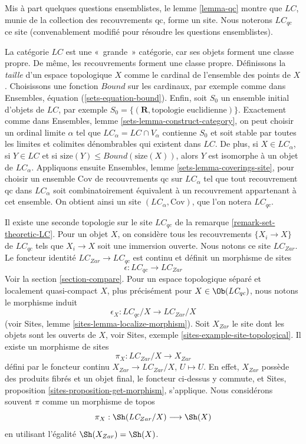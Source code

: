 \noindent
Mis à part quelques questions ensemblistes, le lemme \ref{lemma-qc} montre
que $\textit{LC}$, munie de la collection des recouvrements qc, forme un
site. Nous noterons $\textit{LC}_{qc}$ ce site (convenablement modifié pour
résoudre les questions ensemblistes).

\begin{remark}
\label{remark-set-theoretic-LC}
La catégorie $\textit{LC}$ est une «~grande~» catégorie, car ses objets
forment une classe propre. De même, les recouvrements forment une classe
propre. Définissons la {\it taille} d'un espace topologique $X$ comme le
cardinal de l'ensemble des points de $X$. Choisissons une fonction $Bound$ sur
les cardinaux, par exemple comme dans
Ensembles, équation (\ref{sets-equation-bound}).
Enfin, soit $S_0$ un ensemble initial d'objets de $\textit{LC}$, par exemple
$S_0 = \{(\mathbf{R}, \text{topologie euclidienne})\}$.
Exactement comme dans Ensembles, lemme \ref{sets-lemma-construct-category},
on peut choisir un ordinal limite $\alpha$ tel que
$\textit{LC}_\alpha = \textit{LC} \cap V_\alpha$ contienne $S_0$ et soit
stable par toutes les limites et colimites dénombrables qui existent dans
$\textit{LC}$. De plus, si $X \in \textit{LC}_\alpha$, si
$Y \in \textit{LC}$ et si
$\text{size}(Y) \leq Bound(\text{size}(X))$, alors $Y$ est isomorphe à un
objet de $\textit{LC}_\alpha$.
Appliquons ensuite Ensembles, lemme \ref{sets-lemma-coverings-site}, pour
choisir un ensemble $\text{Cov}$ de recouvrements qc sur
$\textit{LC}_\alpha$ tel que tout recouvrement qc dans
$\textit{LC}_\alpha$ soit combinatoirement équivalent à un recouvrement
appartenant à cet ensemble. On obtient ainsi un site
$(\textit{LC}_\alpha, \text{Cov})$, que l'on notera $\textit{LC}_{qc}$.
\end{remark}

\noindent
Il existe une seconde topologie sur le site $\textit{LC}_{qc}$ de la
remarque \ref{remark-set-theoretic-LC}. Pour un objet $X$, on considère tous
les recouvrements $\{X_i \to X\}$ de $\textit{LC}_{qc}$ tels que
$X_i \to X$ soit une immersion ouverte. Nous notons ce site
$\textit{LC}_{Zar}$. Le foncteur identité
$\textit{LC}_{Zar} \to \textit{LC}_{qc}$ est continu et définit un morphisme
de sites
$$
\epsilon : \textit{LC}_{qc} \longrightarrow \textit{LC}_{Zar}
$$
Voir la section \ref{section-compare}.
Pour un espace topologique séparé et localement quasi-compact $X$, plus
précisément pour $X \in \Ob(\textit{LC}_{qc})$, nous notons le morphisme
induit
$$
\epsilon_X : \textit{LC}_{qc}/X \longrightarrow \textit{LC}_{Zar}/X
$$
(voir Sites, lemme \ref{sites-lemma-localize-morphism}).
Soit $X_{Zar}$ le site dont les objets sont les ouverts de $X$, voir
Sites, exemple \ref{sites-example-site-topological}.
Il existe un morphisme de sites
$$
\pi_X : \textit{LC}_{Zar}/X \longrightarrow X_{Zar}
$$
défini par le foncteur continu
$X_{Zar} \to \textit{LC}_{Zar}/X$, $U \mapsto U$.
En effet, $X_{Zar}$ possède des produits fibrés et un objet final, le
foncteur ci-dessus y commute, et Sites, proposition
\ref{sites-proposition-get-morphism}, s'applique.
Nous considérons souvent $\pi$ comme un morphisme de topos
$$
\pi_X : \Sh(\textit{LC}_{Zar}/X) \longrightarrow \Sh(X)
$$
en utilisant l'égalité $\Sh(X_{Zar}) = \Sh(X)$.

